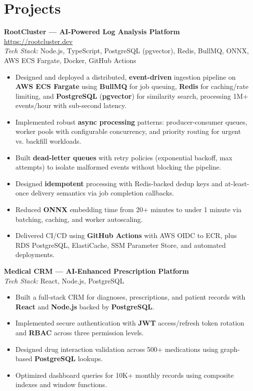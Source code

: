 \documentclass[10pt, a4paper]{article}
\begin{document}
\section{Projects}
\textbf{RootCluster — AI-Powered Log Analysis Platform} \href{https://rootcluster.dev}{https://rootcluster.dev}\\
\textit{Tech Stack:} Node.js, TypeScript, PostgreSQL (pgvector), Redis, BullMQ, ONNX, AWS ECS Fargate, Docker, GitHub Actions\\
\begin{itemize}
\item Designed and deployed a distributed, \textbf{event-driven} ingestion pipeline on \textbf{AWS ECS Fargate} using \textbf{BullMQ} for job queuing, \textbf{Redis} for caching/rate limiting, and \textbf{PostgreSQL} (\textbf{pgvector}) for similarity search, processing 1M+ events/hour with sub-second latency.
\item Implemented robust \textbf{async processing} patterns: producer-consumer queues, worker pools with configurable concurrency, and priority routing for urgent vs. backfill workloads.
\item Built \textbf{dead-letter queues} with retry policies (exponential backoff, max attempts) to isolate malformed events without blocking the pipeline.
\item Designed \textbf{idempotent} processing with Redis-backed dedup keys and at-least-once delivery semantics via job completion callbacks.
\item Reduced \textbf{ONNX} embedding time from 20+ minutes to under 1 minute via batching, caching, and worker autoscaling.
\item Delivered CI/CD using \textbf{GitHub Actions} with AWS OIDC to ECR, plus RDS PostgreSQL, ElastiCache, SSM Parameter Store, and automated deployments.
\end{itemize}

\textbf{Medical CRM — AI-Enhanced Prescription Platform}\\
\textit{Tech Stack:} React, Node.js, PostgreSQL\\
\begin{itemize}
\item Built a full-stack CRM for diagnoses, prescriptions, and patient records with \textbf{React} and \textbf{Node.js} backed by \textbf{PostgreSQL}.
\item Implemented secure authentication with \textbf{JWT} access/refresh token rotation and \textbf{RBAC} across three permission levels.
\item Designed drug interaction validation across 500+ medications using graph-based \textbf{PostgreSQL} lookups.
\item Optimized dashboard queries for 10K+ monthly records using composite indexes and window functions.
\end{itemize}
\end{document}
